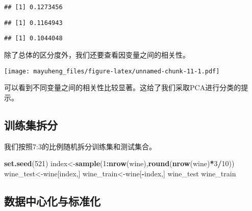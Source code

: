 \documentclass[]{article}
\newenvironment{Shaded}{\begin{snugshade}}{\end{snugshade}}
\newcommand{\DataTypeTok}[1]{\textcolor[rgb]{0.13,0.29,0.53}{#1}}
\newcommand{\DecValTok}[1]{\textcolor[rgb]{0.00,0.00,0.81}{#1}}
\newcommand{\FloatTok}[1]{\textcolor[rgb]{0.00,0.00,0.81}{#1}}
\newcommand{\KeywordTok}[1]{\textcolor[rgb]{0.13,0.29,0.53}{\textbf{#1}}}
\newcommand{\NormalTok}[1]{#1}
\newcommand{\OperatorTok}[1]{\textcolor[rgb]{0.81,0.36,0.00}{\textbf{#1}}}
\newcommand{\StringTok}[1]{\textcolor[rgb]{0.31,0.60,0.02}{#1}}
\begin{document}
\begin{verbatim}
## [1] 0.1273456
\end{verbatim}

\begin{verbatim}
## [1] 0.1164943
\end{verbatim}

\begin{verbatim}
## [1] 0.1044048
\end{verbatim}

除了总体的区分度外，我们还要查看因变量之间的相关性。

\begin{Shaded}
\end{Shaded}

\texttt{[image: mayuheng\_files/figure-latex/unnamed-chunk-11-1.pdf]}

可以看到不同变量之间的相关性比较显著。这给了我们采取PCA进行分类的提示。

\subsection{训练集拆分}

我们按照7:3的比例随机拆分训练集和测试集合。

\begin{Shaded}
\begin{Highlighting}[]
\KeywordTok{set.seed}\NormalTok{(}\DecValTok{521}\NormalTok{)}
\NormalTok{index<-}\KeywordTok{sample}\NormalTok{(}\DecValTok{1}\OperatorTok{:}\KeywordTok{nrow}\NormalTok{(wine),}\KeywordTok{round}\NormalTok{(}\KeywordTok{nrow}\NormalTok{(wine)}\OperatorTok{*}\DecValTok{3}\OperatorTok{/}\DecValTok{10}\NormalTok{))}
\NormalTok{wine_test<-wine[index,]}
\NormalTok{wine_train<-wine[}\OperatorTok{-}\NormalTok{index,]}
\NormalTok{wine_test}
\NormalTok{wine_train}
\end{Highlighting}
\end{Shaded}

\subsection{数据中心化与标准化}
\end{document}
